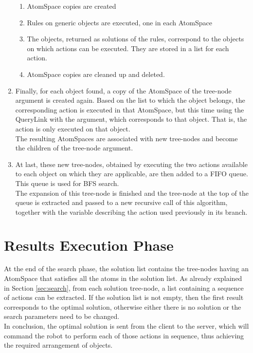 \begin{enumerate}
	\begin{enumerate}
		\item AtomSpace copies are created
		\item Rules on generic objects are executed, one in each AtomSpace
		\item The objects, returned as solutions of the rules, correspond to the objects on which actions can be executed. They are stored in a list for each action.
		\item AtomSpace copies are cleaned up and deleted.
	\end{enumerate}

	\item Finally, for each object found, a copy of the AtomSpace of the tree-node argument is created again. Based on the list to which the object belongs, the corresponding action is executed in that AtomSpace, but this time using the QueryLink with the argument, which corresponds to that object. That is, the action is only executed on that object. \\
The resulting AtomSpaces are associated with new tree-nodes and become the children of the tree-node argument.
	
	\item At last, these new tree-nodes, obtained by executing the two actions available to each object on which they are applicable, are then added to a FIFO queue.
This queue is used for BFS search. \\
The expansion of this tree-node is finished and the tree-node at the top of the queue is extracted and passed to a new recursive call of this algorithm, together with the variable describing the action used previously in its branch. 
\end{enumerate}


\section{Results Execution Phase}\label{sec:results_exec}

At the end of the search phase, the solution list contains the tree-nodes having an AtomSpace that satisfies all the atoms in the solution list.
As already explained in Section \ref{sec:search}, from each solution tree-node, a list containing a sequence of actions can be extracted.
If the solution list is not empty, then the first result corresponds to the optimal solution, otherwise either there is no solution or the search parameters need to be changed. \\
In conclusion, the optimal solution is sent from the client to the server, which will command the robot to perform each of those actions in sequence, thus achieving the required arrangement of objects.

